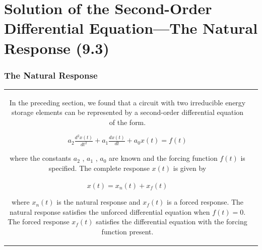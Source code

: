 \documentclass[aspectratio=169]{beamer}
\begin{document}
\section{Solution of the Second-Order Differential Equation—The Natural Response (9.3)}
\begin{frame}[fragile]
	\frametitle{The Natural Response}

		\begin{tabular}{cc}
			\begin{columns}
\small				\begin{column}{1\textwidth}  %
					In the preceding section, we found that a circuit with two irreducible energy storage elements can be
represented by a second-order differential equation of the form. 
\begin{center}
$a_2\frac{d^2x(t)}{dt^2}+a_1\frac{dx(t)}{dt}+a_0x(t)=f(t)$

\end{center}
where the constants $a_2$ , $a_1$ , $a_0$ are known and the forcing function $f(t)$ is specified.
The complete response $x(t)$ is given by
\begin{center}
$x(t)=x_n(t)+x_f(t)$
\end{center}
where $x_n(t)$ is the natural response and $x_f(t)$ is a forced response. \newline \newline The natural response satisfies the unforced
differential equation when $f(t)=0$. The forced response $x_f(t)$ satisfies the differential equation with the
forcing function present.
		
				\end{column}
			\end{columns}\\	
	\end{tabular}	
\end{frame}
\end{document}
